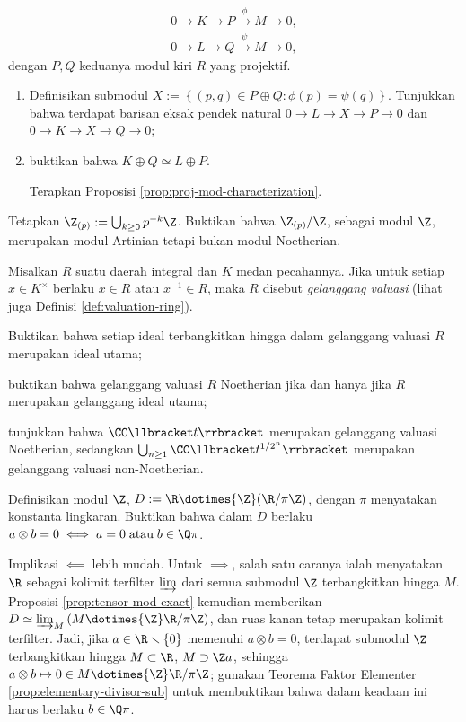 \begin{Exercises}
\begin{gather*}
			0 \to K \to P \xrightarrow{\phi} M \to 0, \\
			0 \to L \to Q \xrightarrow{\psi} M \to 0,
		\end{gather*}
		dengan $P, Q$ keduanya modul kiri $R$ yang projektif.
		\begin{enumerate}
			\item Definisikan submodul $X := \left\{(p,q) \in P \oplus Q: \phi(p) = \psi(q) \right\}$. Tunjukkan bahwa terdapat barisan eksak pendek natural $0 \to L \to X \to P \to 0$ dan $0 \to K \to X \to Q \to 0$;
			\item buktikan bahwa $K \oplus Q \simeq L \oplus P$. \begin{hint} Terapkan Proposisi \ref{prop:proj-mod-characterization}. \end{hint}
		\end{enumerate}
	\item Tetapkan $\Z_{(p)} := \bigcup_{k \geq 0} p^{-k}\Z$. Buktikan bahwa $\Z_{(p)}/\Z$, sebagai modul $\Z$, merupakan modul Artinian tetapi bukan modul Noetherian.
	\item Misalkan $R$ suatu daerah integral dan $K$ medan pecahannya. Jika untuk setiap $x \in K^\times$ berlaku $x \in R$ atau $x^{-1} \in R$, maka $R$ disebut \emph{gelanggang valuasi} (lihat juga Definisi \ref{def:valuation-ring}).
		\begin{compactenum}[(i)]
			\item Buktikan bahwa setiap ideal terbangkitkan hingga dalam gelanggang valuasi $R$ merupakan ideal utama;
			\item buktikan bahwa gelanggang valuasi $R$ Noetherian jika dan hanya jika $R$ merupakan gelanggang ideal utama;
			\item tunjukkan bahwa $\CC\llbracket t \rrbracket$ merupakan gelanggang valuasi Noetherian, sedangkan $\bigcup_{n \geq 1} \CC \llbracket t^{1/2^n} \rrbracket$ merupakan gelanggang valuasi non-Noetherian.
		\end{compactenum}
	\item Definisikan modul $\Z$, $D := \R \dotimes{\Z} (\R/\pi\Z)$, dengan $\pi$ menyatakan konstanta lingkaran. Buktikan bahwa dalam $D$ berlaku $a \otimes b = 0 \iff a = 0 \;\text{atau}\; b \in \Q\pi$.
		\begin{hint}
			Implikasi $\impliedby$ lebih mudah. Untuk $\implies$, salah satu caranya ialah menyatakan $\R$ sebagai kolimit terfilter $\varinjlim$ dari semua submodul $\Z$ terbangkitkan hingga $M$. Proposisi \ref{prop:tensor-mod-exact} kemudian memberikan $D \simeq \varinjlim_M \left( M \dotimes{\Z} \R/\pi\Z \right)$, dan ruas kanan tetap merupakan kolimit terfilter. Jadi, jika $a \in \R \smallsetminus \{0\}$ memenuhi $a \otimes b = 0$, terdapat submodul $\Z$ terbangkitkan hingga $M \subset \R$, $M \supset \Z a$, sehingga $a \otimes b \mapsto 0 \in M \dotimes{\Z} \R/\pi\Z$; gunakan Teorema Faktor Elementer \ref{prop:elementary-divisor-sub} untuk membuktikan bahwa dalam keadaan ini harus berlaku $b \in \Q\pi$.

\end{hint}
\end{Exercises}

